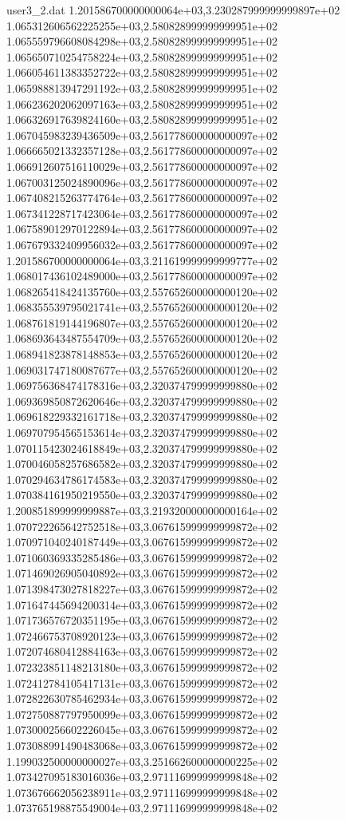 \begin{filecontents}{user3_2.dat}
1.201586700000000064e+03,3.230287999999999897e+02
1.065312606562225255e+03,2.580828999999999951e+02
1.065559796608084298e+03,2.580828999999999951e+02
1.065650710254758224e+03,2.580828999999999951e+02
1.066054611383352722e+03,2.580828999999999951e+02
1.065988813947291192e+03,2.580828999999999951e+02
1.066236202062097163e+03,2.580828999999999951e+02
1.066326917639824160e+03,2.580828999999999951e+02
1.067045983239436509e+03,2.561778600000000097e+02
1.066665021332357128e+03,2.561778600000000097e+02
1.066912607516110029e+03,2.561778600000000097e+02
1.067003125024890096e+03,2.561778600000000097e+02
1.067408215263774764e+03,2.561778600000000097e+02
1.067341228717423064e+03,2.561778600000000097e+02
1.067589012970122894e+03,2.561778600000000097e+02
1.067679332409956032e+03,2.561778600000000097e+02
1.201586700000000064e+03,3.211619999999999777e+02
1.068017436102489000e+03,2.561778600000000097e+02
1.068265418424135760e+03,2.557652600000000120e+02
1.068355539795021741e+03,2.557652600000000120e+02
1.068761819144196807e+03,2.557652600000000120e+02
1.068693643487554709e+03,2.557652600000000120e+02
1.068941823878148853e+03,2.557652600000000120e+02
1.069031747180087677e+03,2.557652600000000120e+02
1.069756368474178316e+03,2.320374799999999880e+02
1.069369850872620646e+03,2.320374799999999880e+02
1.069618229332161718e+03,2.320374799999999880e+02
1.069707954565153614e+03,2.320374799999999880e+02
1.070115423024618849e+03,2.320374799999999880e+02
1.070046058257686582e+03,2.320374799999999880e+02
1.070294634786174583e+03,2.320374799999999880e+02
1.070384161950219550e+03,2.320374799999999880e+02
1.200851899999999887e+03,3.219320000000000164e+02
1.070722265642752518e+03,3.067615999999999872e+02
1.070971040240187449e+03,3.067615999999999872e+02
1.071060369335285486e+03,3.067615999999999872e+02
1.071469026905040892e+03,3.067615999999999872e+02
1.071398473027818227e+03,3.067615999999999872e+02
1.071647445694200314e+03,3.067615999999999872e+02
1.071736576720351195e+03,3.067615999999999872e+02
1.072466753708920123e+03,3.067615999999999872e+02
1.072074680412884163e+03,3.067615999999999872e+02
1.072323851148213180e+03,3.067615999999999872e+02
1.072412784105417131e+03,3.067615999999999872e+02
1.072822630785462934e+03,3.067615999999999872e+02
1.072750887797950099e+03,3.067615999999999872e+02
1.073000256602226045e+03,3.067615999999999872e+02
1.073088991490483068e+03,3.067615999999999872e+02
1.199032500000000027e+03,3.251662600000000225e+02
1.073427095183016036e+03,2.971116999999999848e+02
1.073676662056238911e+03,2.971116999999999848e+02
1.073765198875549004e+03,2.971116999999999848e+02

\end{filecontents}
